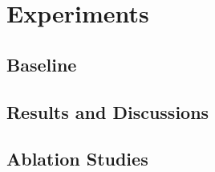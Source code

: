 \documentclass[journal,article,submit,pdftex,moreauthors]{Definitions/mdpi}
\begin{document}
\section{Experiments}
\subsection{Baseline}
\subsection{Results and Discussions}
\subsection{Ablation Studies}






\end{document}
